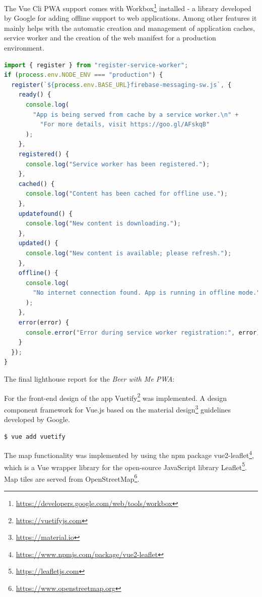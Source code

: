 
The Vue Cli PWA support comes with Workbox\footnote{\url{https://developers.google.com/web/tools/workbox}} installed - a library developed by Google for adding offline support to web applications. Among other features it mainly helps with the automatic creation and management of application caches, service worker and the creation of the web manifest for a production environment.

\begin{lstlisting}[language=JavaScript, caption=registerServiceWorker.js: Workbox registering the service worker for production, label=lst:workbox]
import { register } from "register-service-worker";
if (process.env.NODE_ENV === "production") {
  register(`${process.env.BASE_URL}firebase-messaging-sw.js`, {
    ready() {
      console.log(
        "App is being served from cache by a service worker.\n" +
          "For more details, visit https://goo.gl/AFskqB"
      );
    },
    registered() {
      console.log("Service worker has been registered.");
    },
    cached() {
      console.log("Content has been cached for offline use.");
    },
    updatefound() {
      console.log("New content is downloading.");
    },
    updated() {
      console.log("New content is available; please refresh.");
    },
    offline() {
      console.log(
        "No internet connection found. App is running in offline mode."
      );
    },
    error(error) {
      console.error("Error during service worker registration:", error);
    }
  });
}
\end{lstlisting}

The final lighthouse report for the \textit{Beer with Me PWA}:

For the front-end design of the app Vuetify\footnote{\url{https://vuetifyjs.com}} was implemented. A design component framework for Vue.js based on the material design\footnote{\url{https://material.io}} guidelines developed by Google.

\begin{lstlisting}[language=bash, caption=Command to add Vuetify to the Vue.js project, label=lst:vuetify]
  $ vue add vuetify
\end{lstlisting}

The map functionality was implemented by using the npm package vue2-leaflet\footnote{\url{https://www.npmjs.com/package/vue2-leaflet}}, which is a Vue wrapper library for the open-source JavaScript library Leaflet\footnote{\url{https://leafletjs.com}}. Map tiles are served from OpenStreetMap\footnote{\url{https://www.openstreetmap.org}}.

